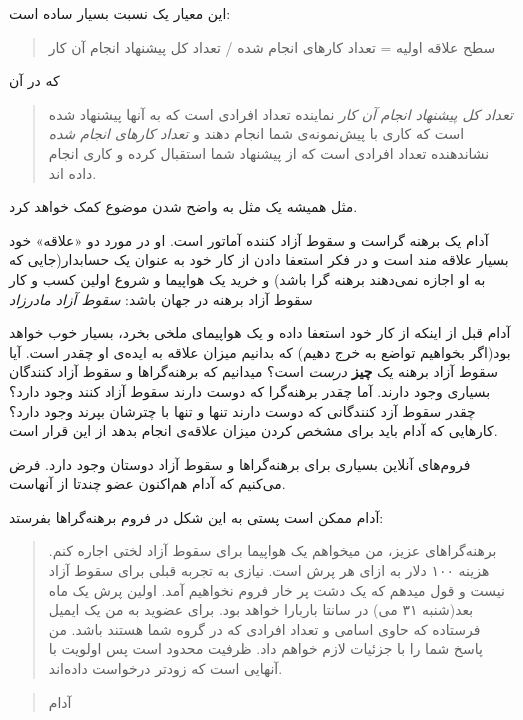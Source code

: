 این معیار یک نسبت بسیار ساده است:

\begin{quote}
سطح علاقه اولیه = تعداد کارهای انجام شده / تعداد کل پیشنهاد انجام آن کار
\end{quote}

که در آن

\begin{quote}
\emph{تعداد کل پیشنهاد انجام آن کار} نماینده تعداد افرادی است که به آنها
پیشنهاد شده است که کاری با پیش‌نمونه‌ی شما انجام دهند و \emph{تعداد
کارهای انجام شده} نشاندهنده تعداد افرادی است که از پیشنهاد شما استقبال
کرده و کاری انجام داده اند.
\end{quote}

مثل همیشه یک مثل به واضح شدن موضوع کمک خواهد کرد.

آدام یک برهنه گراست و سقوط آزاد کننده آماتور است. او در مورد دو «علاقه»
خود بسیار علاقه مند است و در فکر استعفا دادن از کار خود به عنوان یک
حسابدار(جایی که به او اجازه نمی‌دهند برهنه گرا باشد) و خرید یک هواپیما و
شروع اولین کسب و کار سقوط آزاد برهنه در جهان باشد: \emph{سقوط آزاد
مادرزاد}

آدام قبل از اینکه از کار خود استعفا داده و یک هواپیمای ملخی بخرد، بسیار
خوب خواهد بود(اگر بخواهیم تواضع به خرج دهیم) که بدانیم میزان علاقه به
ایده‌ی او چقدر است. آیا سقوط آزاد برهنه یک \textbf{چیز} \emph{درست} است؟
میدانیم که برهنه‌گراها و سقوط آزاد کنندگان بسیاری وجود دارند. آما چقدر
برهنه‌گرا که دوست دارند سقوط آزاد کنند وجود دارد؟ چقدر سقوط آزد کنندگانی
که دوست دارند تنها و تنها با چترشان بپرند وجود دارد؟ کارهایی که آدام
باید برای مشخص کردن میزان علاقه‌ی انجام بدهد از این قرار است.

فروم‌های آنلاین بسیاری برای برهنه‌گراها و سقوط آزاد دوستان وجود دارد.
فرض می‌کنیم که آدام هم‌اکنون عضو چندتا از آنهاست.

آدام ممکن است پستی به این شکل در فروم برهنه‌گراها بفرستد:

\begin{quote}
برهنه‌گراهای عزیز، من میخواهم یک هواپیما برای سقوط آزاد لختی اجاره کنم.
هزینه ۱۰۰ دلار به ازای هر پرش است. نیازی به تجربه قبلی برای سقوط آزاد
نیست و قول میدهم که یک دشت پر خار فروم نخواهیم آمد. اولین پرش یک ماه
بعد(شنبه ۳۱ می) در سانتا باربارا خواهد بود. برای عضوید به من یک ایمیل
فرستاده که حاوی اسامی و تعداد افرادی که در گروه شما هستند باشد. من پاسخ
شما را با جزئیات لازم خواهم داد. ظرفیت محدود است پس اولویت با آنهایی است
که زودتر درخواست داده‌اند.
\end{quote}

\begin{quote}
آدام
\end{quote}
